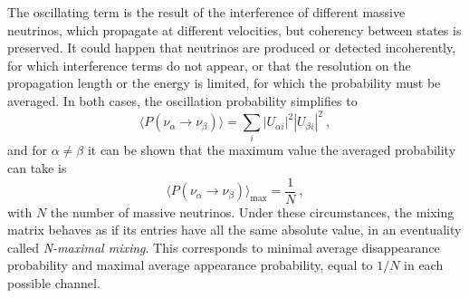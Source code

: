 The oscillating term is the result of the interference of different massive neutrinos, %
which propagate at different velocities, but coherency between states is preserved.
It could happen that neutrinos are produced or detected incoherently, for which interference terms %
do not appear, or that the resolution on the propagation length or the energy is limited, %
for which the probability must be averaged.
In both cases, the oscillation probability simplifies to
\begin{equation}
	\label{eq:average_oscillation}
	\langle P(\nu_\alpha \to \nu_\beta)\rangle = \sum_{i} |U_{\alpha i}|^2 |U_{\beta i}|^2\ ,
\end{equation}
and for $\alpha \neq \beta$ it can be shown that the maximum value the averaged probability %
can take is 
\begin{equation}
	\langle P(\nu_\alpha \to \nu_\beta)\rangle_\text{max} = \frac{1}{N}\ ,
\end{equation}
with $N$ the number of massive neutrinos.
Under these circumstances, the mixing matrix behaves as if its entries have all the same absolute value, %
in an eventuality called \emph{N-maximal mixing}.
This corresponds to minimal average disappearance probability and maximal %
average appearance probability, equal to $1/N$ in each possible channel.

